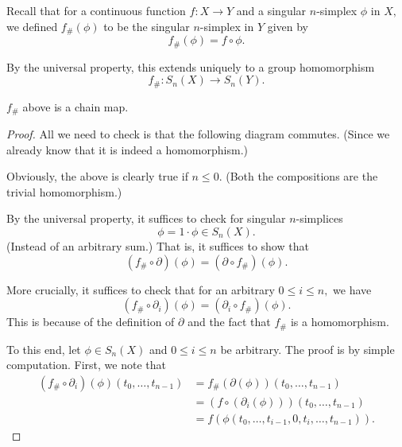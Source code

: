 \documentclass[12pt]{article}
\begin{document}
Recall that for a continuous function $f:X\to Y$ and a singular $n$-simplex $\phi$ in $X,$ we defined $f_\#(\phi)$ to be the singular $n$-simplex in $Y$ given by
\begin{equation*} 
	f_\#(\phi) = f\circ\phi.
\end{equation*}

By the universal property, this extends uniquely to a group homomorphism
\begin{equation*} 
	f_\#:S_n(X) \to S_n(Y).
\end{equation*}

\begin{prop}
	$f_\#$ above is a chain map.
\end{prop}
\begin{proof} 
	All we need to check is that the following diagram commutes. (Since we already know that it is indeed a homomorphism.)

	\begin{center}
	\end{center}

	Obviously, the above is clearly true if $n \le 0.$ (Both the compositions are the trivial homomorphism.)

	By the universal property, it suffices to check for singular $n$-simplices 
	\begin{equation*} 
		\phi = 1\cdot\phi \in S_n(X).
	\end{equation*} 
	(Instead of an arbitrary sum.) That is, it suffices to show that 
	\begin{equation*} 
		(f_\#\circ\partial)(\phi) = (\partial\circ f_\#)(\phi).
	\end{equation*}

	More crucially, it suffices to check that for an arbitrary $0 \le i \le n,$ we have
	\begin{equation*} 
		(f_\#\circ\partial_i)(\phi) = (\partial_i\circ f_\#)(\phi).
	\end{equation*}
	This is because of the definition of $\partial$ and the fact that $f_\#$ is a homomorphism.

	To this end, let $\phi \in S_{n}(X)$ and $0 \le i \le n$ be arbitrary. The proof is by simple computation. First, we note that
	\begin{align*} 
		(f_\#\circ\partial_i)(\phi)(t_0, \ldots, t_{n-1}) &= f_\#(\partial(\phi))(t_0, \ldots, t_{n-1})\\
		&= (f\circ(\partial_i(\phi)))(t_0, \ldots, t_{n-1})\\
		&= f(\phi(t_0, \ldots, t_{i-1}, 0, t_i, \ldots, t_{n-1})).
	\end{align*}


\end{proof}
\end{document}
